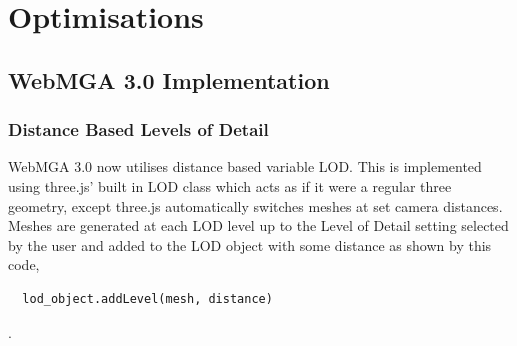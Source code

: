 \section{Optimisations}
\subsection{WebMGA 3.0 Implementation}
\subsubsection{Distance Based Levels of Detail}
WebMGA 3.0 now utilises distance based variable LOD. This is implemented using three.js' built in LOD class \cite{lod_three} which acts as if it were a regular three geometry, except three.js automatically switches meshes at set camera distances. Meshes are generated at each LOD level up to the Level of Detail setting selected by the user and added to the LOD object with some distance as shown by this code,
\begin{lstlisting}
  lod_object.addLevel(mesh, distance)
\end{lstlisting}.

